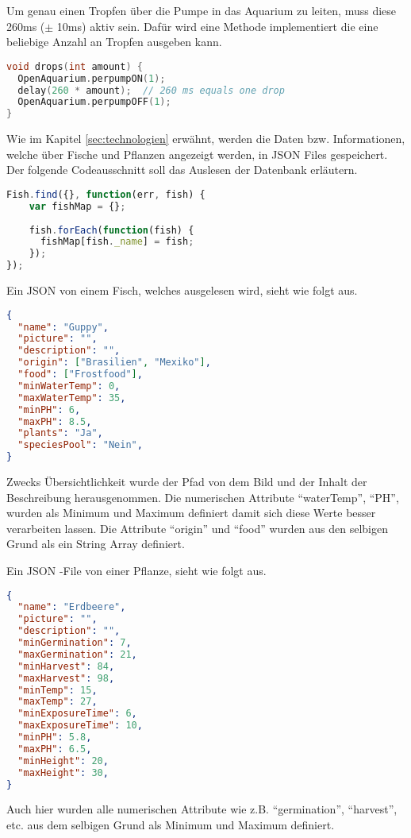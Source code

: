 Um genau einen Tropfen über die Pumpe in das Aquarium zu leiten, muss diese 260ms ($\pm$ 10ms) aktiv sein. Dafür wird eine Methode implementiert die eine beliebige Anzahl an Tropfen ausgeben kann.
\begin{lstlisting}[language=C, caption=Steuerung der Peristaltikpumpe (Arduino)]
void drops(int amount) {
  OpenAquarium.perpumpON(1);
  delay(260 * amount);  // 260 ms equals one drop
  OpenAquarium.perpumpOFF(1);
}
\end{lstlisting}

\newpage
{}

Wie im Kapitel \ref{sec:technologien} erwähnt, werden die Daten bzw. Informationen, welche über Fische und Pflanzen angezeigt werden, in JSON Files gespeichert. Der folgende Codeausschnitt soll das Auslesen der Datenbank erläutern.

\begin{lstlisting}[language=javascript, caption=Ausgeben der Fische]
Fish.find({}, function(err, fish) {
    var fishMap = {};
    
    fish.forEach(function(fish) {
      fishMap[fish._name] = fish;
    });
});
\end{lstlisting}

Ein JSON von einem Fisch, welches ausgelesen wird, sieht wie folgt aus.

\begin{lstlisting}[language=json, caption=Aufbau des JSONs für ein Fisch]
{
  "name": "Guppy",
  "picture": "",
  "description": "",
  "origin": ["Brasilien", "Mexiko"],
  "food": ["Frostfood"],
  "minWaterTemp": 0,
  "maxWaterTemp": 35,
  "minPH": 6,
  "maxPH": 8.5,
  "plants": "Ja", 
  "speciesPool": "Nein",
}
\end{lstlisting}

Zwecks Übersichtlichkeit wurde der Pfad von dem Bild und der Inhalt der Beschreibung herausgenommen. Die numerischen Attribute "`waterTemp"', "`PH"', wurden als Minimum und Maximum definiert damit sich diese Werte besser verarbeiten lassen. Die Attribute "`origin"' und "`food"' wurden aus den selbigen Grund als ein String Array definiert.

\newpage

Ein JSON -File von einer Pflanze, sieht wie folgt aus.

\begin{lstlisting}[language=json, caption=Aufbau des JSONs für eine Pflanze]
{
  "name": "Erdbeere",
  "picture": "",
  "description": "",
  "minGermination": 7,
  "maxGermination": 21,
  "minHarvest": 84,
  "maxHarvest": 98,
  "minTemp": 15,
  "maxTemp": 27,
  "minExposureTime": 6,
  "maxExposureTime": 10,
  "minPH": 5.8,
  "maxPH": 6.5,
  "minHeight": 20,
  "maxHeight": 30,
}
\end{lstlisting}

Auch hier wurden alle numerischen Attribute wie z.B. "`germination"', "`harvest"', etc. aus dem selbigen Grund als Minimum und Maximum definiert.


